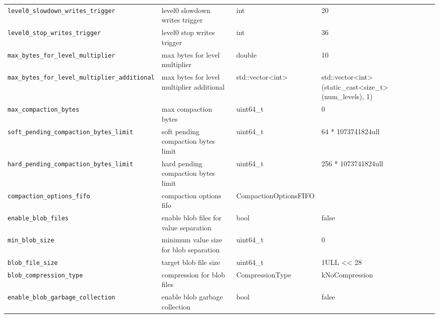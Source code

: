 {{\begin{longtable}{@{}p{3.4cm}p{5.0cm}p{3.6cm}p{2.5cm}p{2.6cm}@{}}
    \texttt{level0\_slowdown\_writes\_trigger}
    & level0 slowdown writes trigger
    & int
    & 20
    & \\

    \texttt{level0\_stop\_writes\_trigger}
    & level0 stop writes trigger
    & int
    & 36
    & \\

    \texttt{max\_bytes\_for\_level\_multiplier}
    & max bytes for level multiplier
    & double
    & 10
    & \\

    \texttt{max\_bytes\_for\_level\_multiplier\_additional}
    & max bytes for level multiplier additional
    & std::vector\textless{}int\textgreater{}
    & std::vector\textless{}int\textgreater{}(static\_cast\textless{}size\_t\textgreater{}(num\_levels), 1)
    & \\

    \texttt{max\_compaction\_bytes}
    & max compaction bytes
    & uint64\_t
    & 0
    & \\

    \texttt{soft\_pending\_compaction\_bytes\_limit}
    & soft pending compaction bytes limit
    & uint64\_t
    & 64 * 1073741824ull
    & \\

    \texttt{hard\_pending\_compaction\_bytes\_limit}
    & hard pending compaction bytes limit
    & uint64\_t
    & 256 * 1073741824ull
    & \\

    \texttt{compaction\_options\_fifo}
    & compaction options fifo
    & CompactionOptionsFIFO
    & 
    & \\

    \texttt{enable\_blob\_files}
    & enable blob files for value separation
    & bool
    & false
    & \\

    \texttt{min\_blob\_size}
    & minimum value size for blob separation
    & uint64\_t
    & 0
    & \\

    \texttt{blob\_file\_size}
    & target blob file size
    & uint64\_t
    & 1ULL \textless{}\textless{} 28
    & \\

    \texttt{blob\_compression\_type}
    & compression for blob files
    & CompressionType
    & kNoCompression
    & \\

    \texttt{enable\_blob\_garbage\_collection}
    & enable blob garbage collection
    & bool
    & false
    & \\


\end{longtable}}}
